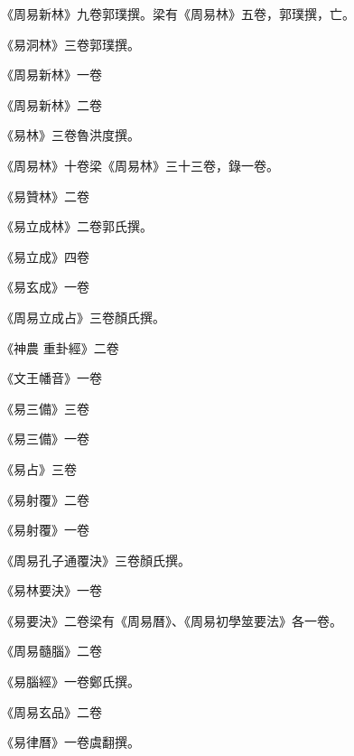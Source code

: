 \begin{pinyinscope}
 《周易新林》九卷郭璞撰。梁有《周易林》五卷，郭璞撰，亡。



 《易洞林》三卷郭璞撰。



 《周易新林》一卷



 《周易新林》二卷



 《易林》三卷魯洪度撰。



 《周易林》十卷梁《周易林》三十三卷，錄一卷。



 《易贊林》二卷



 《易立成林》二卷郭氏撰。



 《易立成》四卷



 《易玄成》一卷



 《周易立成占》三卷顏氏撰。



 《神農
 重卦經》二卷



 《文王幡音》一卷



 《易三備》三卷



 《易三備》一卷



 《易占》三卷



 《易射覆》二卷



 《易射覆》一卷



 《周易孔子通覆決》三卷顏氏撰。



 《易林要決》一卷



 《易要決》二卷梁有《周易曆》、《周易初學筮要法》各一卷。



 《周易髓腦》二卷



 《易腦經》一卷鄭氏撰。



 《周易玄品》二卷



 《易律曆》一卷虞翻撰。




\end{pinyinscope}
